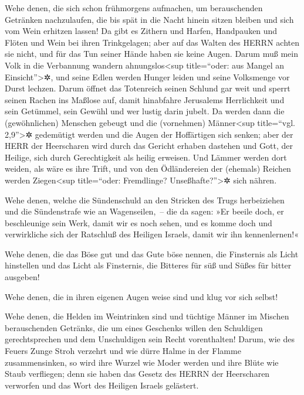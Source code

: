 Wehe denen, die sich schon frühmorgens aufmachen, um
berauschenden Getränken nachzulaufen, die bis spät in die Nacht hinein
sitzen bleiben und sich vom Wein erhitzen lassen! Da gibt
es Zithern und Harfen, Handpauken und Flöten und Wein bei ihren
Trinkgelagen; aber auf das Walten des HERRN achten sie nicht, und für
das Tun seiner Hände haben sie keine Augen. Darum muß
mein Volk in die Verbannung wandern ahnungslos\textless sup
title=``oder: aus Mangel an Einsicht''\textgreater✲, und seine Edlen
werden Hunger leiden und seine Volksmenge vor Durst lechzen.
Darum öffnet das Totenreich seinen Schlund gar weit und
sperrt seinen Rachen ins Maßlose auf, damit hinabfahre Jerusalems
Herrlichkeit und sein Getümmel, sein Gewühl und wer lustig darin jubelt.
Da werden dann die (gewöhnlichen) Menschen gebeugt und
die (vornehmen) Männer\textless sup title=``vgl. 2,9''\textgreater✲
gedemütigt werden und die Augen der Hoffärtigen sich senken;
aber der HERR der Heerscharen wird durch das Gericht
erhaben dastehen und Gott, der Heilige, sich durch Gerechtigkeit als
heilig erweisen. Und Lämmer werden dort weiden, als wäre
es ihre Trift, und von den Ödländereien der (ehemals) Reichen werden
Ziegen\textless sup title=``oder: Fremdlinge? Unseßhafte?''\textgreater✲
sich nähren.

Wehe denen, welche die Sündenschuld an den Stricken des
Trugs herbeiziehen und die Sündenstrafe wie an Wagenseilen,~--
die da sagen: »Er beeile doch, er beschleunige sein Werk,
damit wir es noch sehen, und es komme doch und verwirkliche sich der
Ratschluß des Heiligen Israels, damit wir ihn kennenlernen!«

Wehe denen, die das Böse gut und das Gute böse nennen,
die Finsternis als Licht hinstellen und das Licht als Finsternis, die
Bitteres für süß und Süßes für bitter ausgeben!

Wehe denen, die in ihren eigenen Augen weise sind und
klug vor sich selbst!

Wehe denen, die Helden im Weintrinken sind und tüchtige
Männer im Mischen berauschenden Getränks, die um eines
Geschenks willen den Schuldigen gerechtsprechen und dem Unschuldigen
sein Recht vorenthalten! Darum, wie des Feuers Zunge
Stroh verzehrt und wie dürre Halme in der Flamme zusammensinken, so wird
ihre Wurzel wie Moder werden und ihre Blüte wie Staub verfliegen; denn
sie haben das Gesetz des HERRN der Heerscharen verworfen und das Wort
des Heiligen Israels gelästert.

